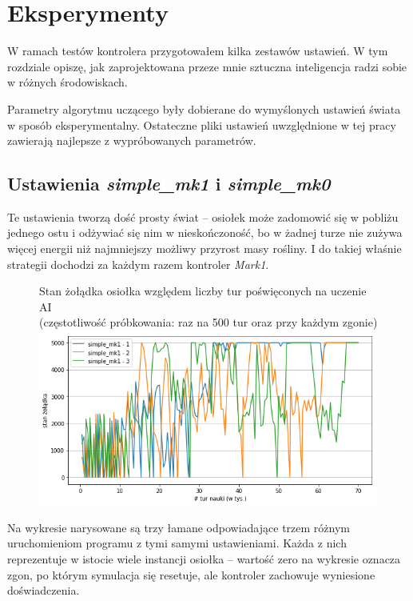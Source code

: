 \chapter{Eksperymenty}
W ramach testów kontrolera przygotowałem kilka zestawów ustawień. W tym rozdziale opiszę, jak zaprojektowana przeze mnie sztuczna inteligencja radzi sobie w różnych środowiskach.

Parametry algorytmu uczącego były dobierane do wymyślonych ustawień świata w sposób eksperymentalny. Ostateczne pliki ustawień uwzględnione w tej pracy zawierają najlepsze z wypróbowanych parametrów.

\section{Ustawienia \textit{simple\_mk1} i \textit{simple\_mk0}}
Te ustawienia tworzą dość prosty świat -- osiołek może zadomowić się w pobliżu jednego ostu i odżywiać się nim w nieskończoność, bo w żadnej turze nie zużywa więcej energii niż najmniejszy możliwy przyrost masy rośliny. I do takiej właśnie strategii dochodzi za każdym razem kontroler \textit{Mark1}.
\begin{figure}[H]
    \centering
    \footnotesize{Stan żołądka osiołka względem liczby tur poświęconych na uczenie AI
    \\(częstotliwość próbkowania: raz na 500 tur oraz przy każdym zgonie)}
    \includegraphics[scale=0.6]{Chapters/simple_mk1_hunger}
\end{figure}

Na wykresie narysowane są trzy łamane odpowiadające trzem różnym uruchomieniom programu z tymi samymi ustawieniami. Każda z nich reprezentuje w istocie wiele instancji osiołka -- wartość zero na wykresie oznacza zgon, po którym symulacja się resetuje, ale kontroler zachowuje wyniesione doświadczenia. 

